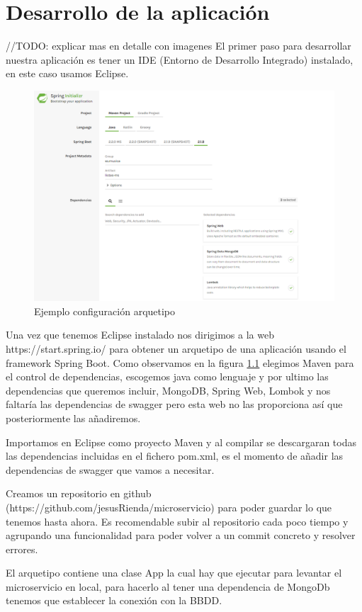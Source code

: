 \documentclass[12pt]{report} %
\begin{document}
\chapter{Desarrollo de la aplicación}

//TODO: explicar mas en detalle con imagenes
El primer paso para desarrollar nuestra aplicación es tener un IDE (Entorno de Desarrollo Integrado) instalado, en este caso usamos Eclipse.

\begin{figure}
	\centering
	\includegraphics[width=0.7\linewidth]{imagenes/arquetipo}
	\caption{Ejemplo configuración arquetipo}
	\label{fig:arquetipo}
\end{figure}

Una vez que tenemos Eclipse instalado nos dirigimos a la web https://start.spring.io/ para obtener un arquetipo de una aplicación usando el framework Spring Boot. Como observamos en la figura \ref{fig:arquetipo} elegimos Maven para el control de dependencias, escogemos java como lenguaje y por ultimo las dependencias que queremos incluir, MongoDB, Spring Web, Lombok y nos faltaría las dependencias de swagger pero esta web no las proporciona así que posteriormente las añadiremos.

Importamos en Eclipse como proyecto Maven y al compilar se descargaran todas las dependencias incluidas en el fichero pom.xml, es el momento de añadir las dependencias de swagger que vamos a necesitar.

Creamos un repositorio en github (https://github.com/jesusRienda/microservicio) para poder guardar lo que tenemos hasta ahora. Es recomendable subir al repositorio cada poco tiempo y agrupando una funcionalidad para poder volver a un commit concreto y resolver errores.

El arquetipo contiene una clase App la cual hay que ejecutar para levantar el microservicio en local, para hacerlo al tener una dependencia de MongoDb tenemos que establecer la conexión con la BBDD.
\end{document}
